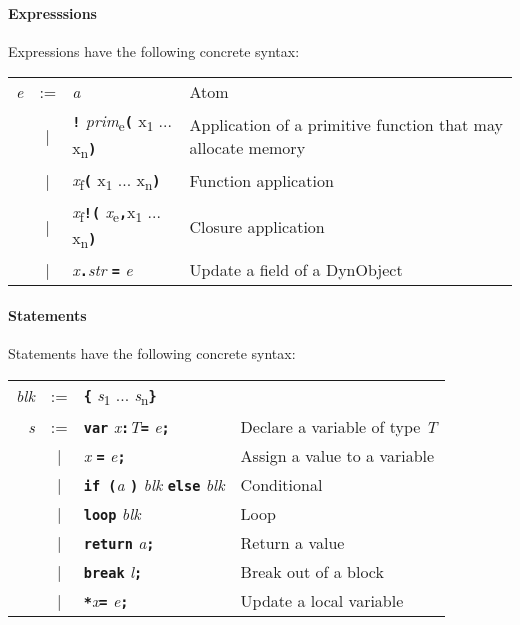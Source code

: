 \documentclass{book}
\newcommand{\kw}[1]{\textbf{\texttt{#1}}}
\newcommand{\metavar}[1]{\textit{#1}}
\begin{document}
\paragraph{Expresssions}
Expressions have the following concrete syntax:

\begin{tabular}{rcll}
\metavar{e} & := & \metavar{a} 
                 & Atom \\
            & |  & \kw{!} \metavar{prim}\textsubscript{e}\kw{(} x\textsubscript{1} ... x\textsubscript{n}\kw{)}            
                 & Application of a primitive function that may allocate memory \\
            & |  & \metavar{x}\textsubscript{f}\kw{(} x\textsubscript{1} ... x\textsubscript{n}\kw{)}
                 & Function application \\
            & |  & \metavar{x}\textsubscript{f}\kw{!(} \metavar{x}\textsubscript{e}\kw{,}x\textsubscript{1} ... x\textsubscript{n}\kw{)}
                 & Closure application \\
            & |  & \metavar{x}\kw{.}\metavar{str} \kw{=} \metavar{e}
                 & \textrm{Update a field of a DynObject} \\
\end{tabular}

\paragraph{Statements}
Statements have the following concrete syntax:

\begin{tabular}{rcll}
\metavar{blk} & := & \kw{\{} \metavar{s}\textsubscript{1} ... \metavar{s}\textsubscript{n}\kw{\}} \\
\metavar{s} & := & \kw{var} \metavar{x}\kw{:}\metavar{T}\kw{=} \metavar{e}\kw{;}
                 & \textrm{Declare a variable of type \metavar{T}} \\
            & |  & \metavar{x} \kw{=} \metavar{e}\kw{;}
                 & \textrm{Assign a value to a variable} \\
            & |  & \kw{if (}\metavar{a} \kw{)} \metavar{blk} \kw{else} \metavar{blk}
                 & \textrm{Conditional} \\
            & |  & \kw{loop} \metavar{blk}
                 & \textrm{Loop} \\
            & |  & \kw{return} \metavar{a}\kw{;}
                 & \textrm{Return a value} \\
            & |  & \kw{break} \metavar{l}\kw{;}
                 & \textrm{Break out of a block} \\
            & |  & \kw{*}\metavar{x}\kw{=} \metavar{e}\kw{;}
                 & \textrm{Update a local variable} \\
\end{tabular}
\end{document}
